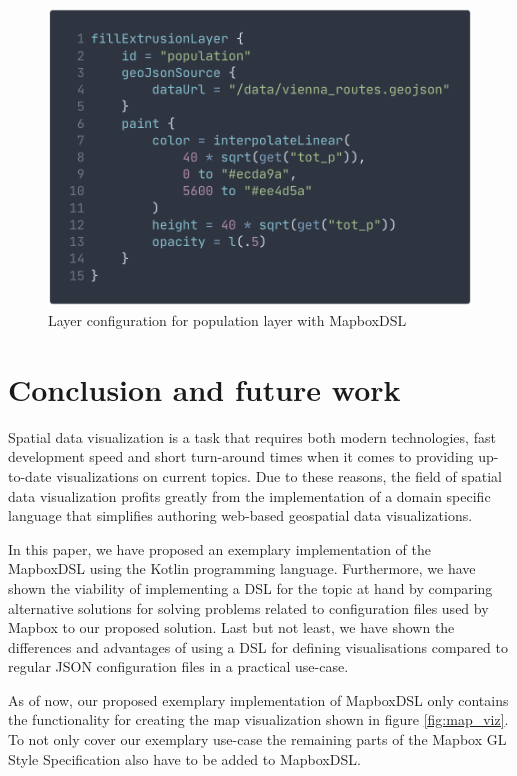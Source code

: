 \documentclass[conference]{IEEEtran}
\begin{document}
\begin{figure}
    \centering
    \includegraphics[width=\columnwidth]{img/vienna-dsl.png}
    \caption{Layer configuration for population layer with MapboxDSL}
    \label{fig:dsl-config}
\end{figure}

\section{Conclusion and future work}

Spatial data visualization is a task that requires both modern technologies, fast development speed and short turn-around times when it comes to providing up-to-date visualizations on current topics. Due to these reasons, the field of spatial data visualization profits greatly from the implementation of a domain specific language that simplifies authoring web-based geospatial data visualizations.

In this paper, we have proposed an exemplary implementation of the MapboxDSL using the Kotlin programming language. Furthermore, we have shown the viability of implementing a DSL for the topic at hand by comparing alternative solutions for solving problems related to configuration files used by Mapbox to our proposed solution. Last but not least, we have shown the differences and advantages of using a DSL for defining visualisations compared to regular JSON configuration files in a practical use-case.

As of now, our proposed exemplary implementation of MapboxDSL only contains the functionality for creating the map visualization shown in figure \ref{fig:map_viz}. To not only cover our exemplary use-case the remaining parts of the Mapbox GL Style Specification also have to be added to MapboxDSL. 
\end{document}
